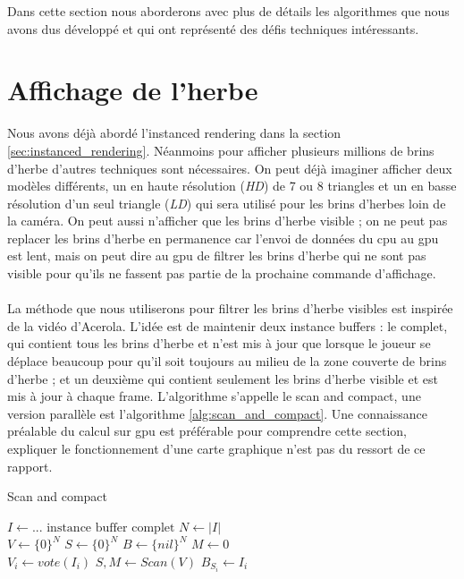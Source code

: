 \documentclass{EPUProjetDi}
\begin{document}
Dans cette section nous aborderons avec plus de détails les algorithmes que nous avons dus développé et qui ont représenté des défis techniques intéressants.

\section{Affichage de l'herbe}
\label{section:grass_rendering}

Nous avons déjà abordé l'instanced rendering dans la section \ref{sec:instanced_rendering}. Néanmoins pour afficher plusieurs millions de brins d'herbe d'autres techniques sont nécessaires. On peut déjà imaginer afficher deux modèles différents, un en haute résolution (\textit{HD}) de 7 ou 8 triangles et un en basse résolution d'un seul triangle (\textit{LD}) qui sera utilisé pour les brins d'herbes loin de la caméra. On peut aussi n'afficher que les brins d'herbe visible ; on ne peut pas replacer les brins d'herbe en permanence car l'envoi de données du cpu au gpu est lent, mais on peut dire au gpu de filtrer les brins d'herbe qui ne sont pas visible pour qu'ils ne fassent pas partie de la prochaine commande d'affichage.

\paragraph{}
La méthode que nous utiliserons pour filtrer les brins d'herbe visibles est inspirée de la vidéo d'Acerola\cite{grass_rendering}. L'idée est de maintenir deux instance buffers : le complet, qui contient tous les brins d'herbe et n'est mis à jour que lorsque le joueur se déplace beaucoup pour qu'il soit toujours au milieu de la zone couverte de brins d'herbe ; et un deuxième qui contient seulement les brins d'herbe visible et est mis à jour à chaque frame. L'algorithme s'appelle le scan and compact, une version parallèle est l'algorithme \ref{alg:scan_and_compact}. Une connaissance préalable du calcul sur gpu est préférable pour comprendre cette section, expliquer le fonctionnement d'une carte graphique n'est pas du ressort de ce rapport.

\begin{algorithm}
\caption{Scan and compact}\label{alg:scan_and_compact}
\begin{algorithmic}
\State $I \gets \text{... instance buffer complet}$
\State $N \gets |I|$
\\
\State $V \gets \{0\}^N$ 
\State $S \gets \{0\}^N$ 
\State $B \gets \{nil\}^N$ 
\State $M \gets 0$ 
\\
	\State $V_i \gets vote(I_i)$ 
\EndParFor
\State $S,M\gets Scan(V)$
		\State $B_{S_i}\gets I_i$
	\EndIf
\EndParFor
\end{algorithmic}
\end{algorithm}
\end{document}
